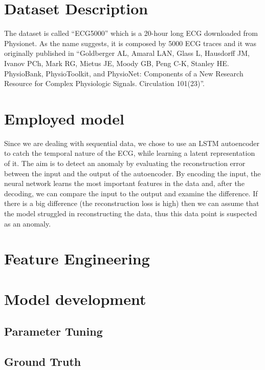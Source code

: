 \documentclass{article}
\begin{document}
\begin{multicols*}{2}
\section{Dataset Description}

 The dataset is called “ECG5000” which is a 20-hour long ECG downloaded from Physionet. As the name suggests, it is composed by 5000 ECG traces and it was originally published in “Goldberger AL, Amaral LAN, Glass L, Hausdorff JM, Ivanov PCh, Mark RG, Mietus JE, Moody GB, Peng C-K, Stanley HE. PhysioBank, PhysioToolkit, and PhysioNet: Components of a New Research Resource for Complex Physiologic Signals. Circulation 101(23)”.
 

\section{Employed model}

Since we are dealing with sequential data, we chose to use an LSTM autoencoder to catch the temporal nature of the ECG, while learning a latent representation of it. The aim is to detect an anomaly by evaluating the reconstruction error between the input and the output of the autoencoder. By encoding the input, the neural network learns the most important features in the data and, after the decoding, we can compare the input to the output and examine the difference. If there is a big difference (the reconstruction loss is high) then we can assume that the model struggled in reconstructing the data, thus this data point is suspected as an anomaly.

\begin{figure}[H]
  \centering
\end{figure}


\section{Feature Engineering }

\section{Model development}


\subsection{Parameter Tuning} 


\subsection{Ground Truth} 



\end{multicols*}
\end{document}
